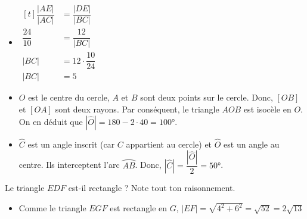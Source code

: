 \documentclass[../partie2.tex]{subfiles}
\begin{document}
\begin{solution}
\begin{tasks}
\begin{itemize}
        \item
        $
        \begin{aligned}[t]
          \dfrac{|AE|}{|AC|} &= \dfrac{|DE|}{|BC|}\\  
          \dfrac{24}{10} &= \dfrac{12}{|BC|}\\
          |BC| &= 12 \cdot \dfrac{10}{24}\\
          |BC| &= 5   
        \end{aligned}
        $ 
    \end{itemize}

    \task
    \begin{itemize}
        \item 
        $O$ est le centre du cercle, $A$ et $B$ sont deux points sur le cercle. Donc, $[OB]$ et $[OA]$ sont deux rayons. Par conséquent, le triangle $AOB$ est isocèle en $O$. On en déduit que $|\widehat{O}| = 180-2\cdot 40 = \ang{100}$.

        \item 
        $\widehat{C}$ est un angle inscrit (car $C$ appartient au cercle) et $\widehat{O}$ est un angle au centre. Ils interceptent l'arc $\wideparen{AB}$. Donc, $|\widehat{C}| = \dfrac{|\widehat{O}|}{2}=\ang{50}$.
    \end{itemize}
\end{tasks}
\end{solution}
\begin{exercise}[points=2]
    Le triangle $EDF$ est-il rectangle ? Note tout ton raisonnement.
    \begin{center}
        
    \end{center}
\end{exercise}
\begin{solution}
    \begin{itemize}
        \item 
        Comme le triangle $EGF$ est rectangle en $G$, $|EF| = \sqrt{4^2 + 6^2} = \sqrt{52} = 2\sqrt{13}$
    \end{itemize}
\end{solution}
\end{document}
